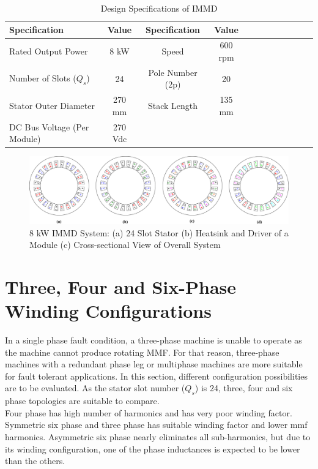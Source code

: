 \documentclass[a4paper,11pt]{article}
\begin{document}
\begin{table}[ht!]
\centering
 \caption{Design Specifications of IMMD}
\label{kd}
\begin{tabularx}{\textwidth}{@{}l*{10}{C}c@{}}

\toprule
Specification  &  Value & Specification  &  Value \\ 
\midrule
Rated Output Power & 8 kW & Speed & 600 rpm\\ 
Number of Slots ($Q_s$) & 24 & Pole Number (2p) & 20 \\
Stator Outer Diameter & 270 mm & Stack Length & 135 mm \\
DC Bus Voltage (Per Module) & 270 Vdc & & \\

\bottomrule
\end{tabularx}
\end{table}

\begin{figure}[ht!]
    \centering
    \includegraphics{windings.png}
    \caption{8 kW IMMD System: (a) 24 Slot Stator (b) Heatsink and Driver of a Module (c) Cross-sectional View of Overall System}
    \label{fig:immd}
\end{figure}

\section{\normalsize\textbf{Three, Four and Six-Phase Winding Configurations}}
In a single phase fault condition, a three-phase machine is unable to operate as the machine cannot produce rotating MMF. For that reason, three-phase machines with a redundant phase leg or multiphase machines are more suitable for fault tolerant applications. \cite{phaseleg}
In this section, different configuration possibilities are to be evaluated. As the stator slot number ($Q_s$) is 24, three, four and six phase topologies are suitable to compare.\\
Four phase has high number of harmonics and has very poor winding factor.\\
Symmetric six phase and three phase has suitable winding factor and lower mmf harmonics.
Asymmetric six phase nearly eliminates all sub-harmonics, but due to its winding configuration, one of the phase inductances is expected to be lower than the others.
\end{document}
